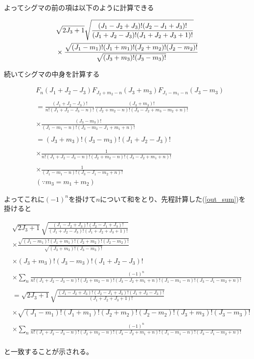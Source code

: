 よってシグマの前の項は以下のように計算できる

\begin{align}\label{out_sum}
    &\sqrt{2J_3 + 1} \sqrt{\frac{ (J_1 - J_2 + J_3)!(J_2 - J_1 + J_3)!}{(J_1 + J_2 - J_3)!(J_1 + J_2 + J_3 + 1)!} }\\ \notag
    &\times
    \frac{\sqrt{(J_1 - m_1)!(J_1 + m_1)!(J_2 + m_2)!(J_2 - m_2)!}}{\sqrt{(J_3 + m_3)!(J_3 - m_3)!}}
\end{align}

続いてシグマの中身を計算する

\begin{align*}
    &F_n(J_1 + J_2 - J_3)F_{J_2 + m_2 - n}(J_3 + m_3) F_{J_1 - m_1 - n}(J_3 - m_3) \\
    \\
    &= \frac{(J_1 + J_2 - J_3)!}{n!(J_1 + J_2 - J_3 - n)!} \frac{(J_3 + m_3)!}{(J_2 + m_2 - n)!(J_3 - J_2 + m_3 - m_2 + n)!} \\
    \\
    &\times \frac{(J_3 - m_3)!}{(J_1 - m_1 - n)!(J_3 - m_3 - J_1 + m_1 + n)!} \\
    \\
    &= (J_3 + m_3)! (J_3 - m_3)! (J_1 + J_2 - J_3)!\\
    \\
    &\times \frac{1}{n!(J_1 + J_2 - J_3 -n)!(J_2 + m_2 - n)!(J_3 - J_2 + m_1 + n)!} \\
    \\
    &\times \frac{1}{(J_1 - m_1 - n)!(J_3 - J_1 - m_2 + n)!} \\ 
    &(\because m_3 = m_1 + m_2)
\end{align*}

よってこれに$(-1)^n$を掛けて$n$について和をとり、先程計算した(\ref{out_sum})を掛けると

\begin{align*}
    &\sqrt{2J_3 + 1} \sqrt{\frac{ (J_1 - J_2 + J_3)!(J_2 - J_1 + J_3)!}{(J_1 + J_2 - J_3)!(J_1 + J_2 + J_3 + 1)!} }\\ 
    &\times
    \frac{\sqrt{(J_1 - m_1)!(J_1 + m_1)!(J_2 + m_2)!(J_2 - m_2)!}}{\sqrt{(J_3 + m_3)!(J_3 - m_3)!}} \\
    \\ 
    &\times (J_3 + m_3)! (J_3 - m_3)! (J_1 + J_2 - J_3)!\\
    \\
    &\times \sum_{n} \frac{(-1)^n}{n!(J_1 + J_2 - J_3 - n)!(J_2 + m_2 - n)!(J_3 - J_2 + m_1 + n)!(J_1 - m_1 - n)!(J_3 - J_1 - m_2 + n )!} \\
    \\
    &=
    \sqrt{2J_3 + 1} \sqrt{\frac{(J_1 - J_2 + J_3)!(J_2 - J_1 + J_3)!(J_1 + J_2 - J_3)!}{(J_1 + J_2 + J_3 + 1)!} }\\ 
    \\
    &\times
    \sqrt{(J_1 - m_1)!(J_1 + m_1)!(J_2 + m_2)!(J_2 - m_2)!(J_3 + m_3)!(J_3 - m_3)!} \\
    \\ 
    &\times \sum_{n} \frac{(-1)^n}{n!(J_1 + J_2 - J_3 - n)!(J_2 + m_2 - n)!(J_3 - J_2 + m_1 + n)!(J_1 - m_1 - n)!(J_3 - J_1 - m_2 + n )!} \\
\end{align*}

と一致することが示される。
